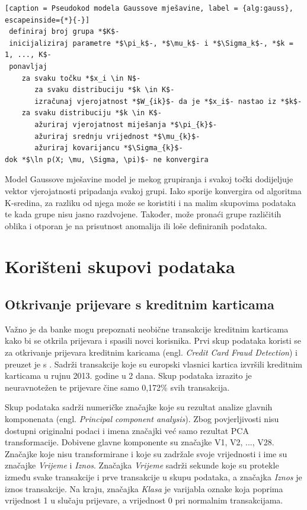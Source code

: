 \documentclass[utf8, diplomski, numeric]{fer}
\begin{document}
\begin{lstlisting}[caption = Pseudokod modela Gaussove mješavine, label = {alg:gauss}, escapeinside={*}{-}]
 definiraj broj grupa *$K$-
 inicijaliziraj parametre *$\pi_k$-, *$\mu_k$- i *$\Sigma_k$-, *$k = 1, ..., K$-
 ponavljaj
    za svaku točku *$x_i \in N$-
       za svaku distribuciju *$k \in K$-
	   izračunaj vjerojatnost *$W_{ik}$- da je *$x_i$- nastao iz *$k$-
    za svaku distribuciju *$k \in K$-
       ažuriraj vjerojatnost miješanja *$\pi_{k}$-
       ažuriraj srednju vrijednost *$\mu_{k}$-
       ažuriraj kovarijancu *$\Sigma_{k}$-
dok *$\ln p(X; \mu, \Sigma, \pi)$- ne konvergira 

\end{lstlisting}

Model Gaussove mješavine model je mekog grupiranja i svakoj točki dodijeljuje vektor vjerojatnosti pripadanja svakoj grupi. Iako sporije konvergira od algoritma K-sredina, za razliku od njega može se koristiti i na malim skupovima podataka te kada grupe nisu jasno razdvojene. Također, može pronaći grupe različitih oblika i otporan je na prisutnost anomalija ili loše definiranih podataka.


\chapter{Korišteni skupovi podataka}
\section{Otkrivanje prijevare s kreditnim karticama}
Važno je da banke mogu prepoznati neobične transakcije kreditnim karticama kako bi se otkrila prijevara i spasili novci korisnika. Prvi skup podataka koristi se za otkrivanje prijevara kreditnim karicama (engl. \textit{Credit Card Fraud Detection}) i preuzet je s \cite{pang2021deep}. Sadrži transakcije koje su europski vlasnici kartica izvršili kreditnim karticama u rujnu 2013. godine u 2 dana. Skup podataka izrazito je neuravnotežen te prijevare čine samo 0,172\% svih transakcija.

Skup podataka sadrži numeričke značajke koje su rezultat analize glavnih komponenata (engl. \textit{Principal component analysis}). Zbog povjerljivosti nisu dostupni originalni podaci i imena značajki već samo rezultat PCA transformacije. Dobivene glavne komponente su značajke V1, V2, ..., V28. Značajke koje nisu transformirane i koje su zadržale svoje vrijednosti i ime su značajke \textit{Vrijeme} i \textit{Iznos}. Značajka \textit{Vrijeme} sadrži sekunde koje su protekle između svake transakcije i prve transakcije u skupu podataka, a značajka \textit{Iznos} je iznos transakcije. Na kraju, značajka \textit{Klasa} je varijabla oznake koja poprima vrijednost 1 u slučaju prijevare, a vrijednost 0 pri normalnim transakcijama.
\end{document}
